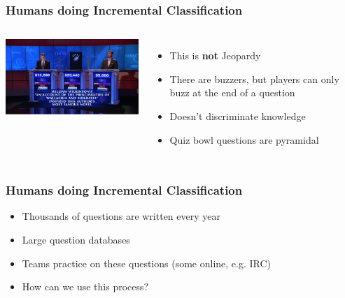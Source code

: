\documentclass[compress]{beamer}
\begin{document}
\begin{frame}
	\frametitle{Humans doing Incremental Classification}

	\begin{columns}

		\includegraphics[width=1.0\linewidth]{qb/jeopardy}


		\begin{itemize}
			\item This is {\bf not} Jeopardy \cite{ferruci-10}
			\item There are buzzers, but players can only buzz at the end of a question
			\item Doesn't discriminate knowledge
			\item Quiz bowl questions are pyramidal
		\end{itemize}

	\end{columns}

\end{frame}



\begin{frame}
	\frametitle{Humans doing Incremental Classification}

	\begin{itemize}
		\item Thousands of questions are written every year
		\item Large question databases
		\item Teams practice on these questions (some online, e.g. IRC)
		\item How can we use this process?
	\end{itemize}

\end{frame}
\end{document}
